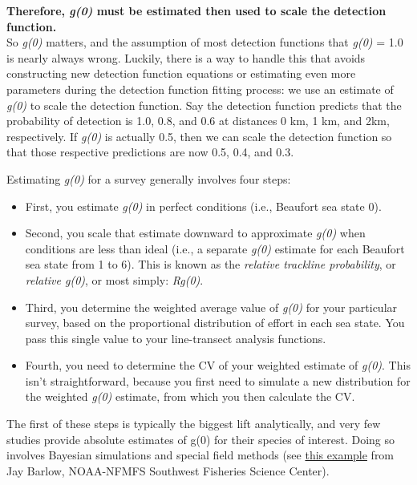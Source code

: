 \documentclass[
]{book}
\begin{document}
\textbf{Therefore, \emph{g(0)} must be estimated then used to scale the detection function.}\\
So \emph{g(0)} matters, and the assumption of most detection functions that \emph{g(0)} = 1.0 is nearly always wrong. Luckily, there is a way to handle this that avoids constructing new detection function equations or estimating even more parameters during the detection function fitting process: we use an estimate of \emph{g(0)} to scale the detection function. Say the detection function predicts that the probability of detection is 1.0, 0.8, and 0.6 at distances 0 km, 1 km, and 2km, respectively. If \emph{g(0)} is actually 0.5, then we can scale the detection function so that those respective predictions are now 0.5, 0.4, and 0.3.

Estimating \emph{g(0)} for a survey generally involves four steps:

\begin{itemize}
\item
  First, you estimate \emph{g(0)} in perfect conditions (i.e., Beaufort sea state 0).
\item
  Second, you scale that estimate downward to approximate \emph{g(0)} when conditions are less than ideal (i.e., a separate \emph{g(0)} estimate for each Beaufort sea state from 1 to 6). This is known as the \emph{relative trackline probability}, or \emph{relative g(0)}, or most simply: \emph{Rg(0)}.
\item
  Third, you determine the weighted average value of \emph{g(0)} for your particular survey, based on the proportional distribution of effort in each sea state. You pass this single value to your line-transect analysis functions.
\item
  Fourth, you need to determine the CV of your weighted estimate of \emph{g(0)}. This isn't straightforward, because you first need to simulate a new distribution for the weighted \emph{g(0)} estimate, from which you then calculate the CV.
\end{itemize}

The first of these steps is typically the biggest lift analytically, and very few studies provide absolute estimates of g(0) for their species of interest. Doing so involves Bayesian simulations and special field methods (see \href{https://www.taylorfrancis.com/chapters/edit/10.1201/9781003211167-19/trackline-detection-probability-long-diving-whales-jay-barlow}{this example} from Jay Barlow, NOAA-NFMFS Southwest Fisheries Science Center).
\end{document}
